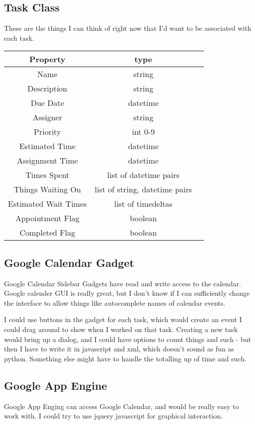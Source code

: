 \documentclass[12pt]{article}
\begin{document}
\subsection{Task Class}
These are the things I can think of right now that I'd want to be associated with each task.
\begin{tabular}{c || c | c }
    Property             & type        \\ \hline
    Name                 & string      \\ \hline
    Description          & string      \\ \hline
    Due Date             & datetime    \\ \hline
    Assigner             & string      \\ \hline
    Priority             & int 0-9     \\ \hline
    Estimated Time       & datetime    \\ \hline
    Assignment Time      & datetime    \\ \hline
    Times Spent          & list of datetime pairs   \\ \hline
    Things Waiting On    & list of string, datetime pairs   \\ \hline
    Estimated Wait Times & list of timedeltas         \\ \hline
    Appointment Flag     & boolean     \\ \hline
    Completed Flag       & boolean     \\ \hline
\end{tabular}

\subsection{Google Calendar Gadget}
Google Calendar Sidebar Gadgets have read and write access to the calendar.
Google calender GUI is really great, but I don't know if I can sufficiently change
the interface to allow things like autocomplete names of calendar events.

I could use buttons in the gadget for each task, which would create an event I could
drag around to show when I worked on that task.  Creating a new task would bring up
a dialog, and I could have options to count things and such - but then I have to write
it in javascript and xml, which doesn't sound as fun as python.  Something else might
have to handle the totalling up of time and such.

\subsection{Google App Engine}
Google App Enging can access Google Calendar, and would be really easy to work with.
I could try to use jquery javascript for graphical interaction.
\end{document}
